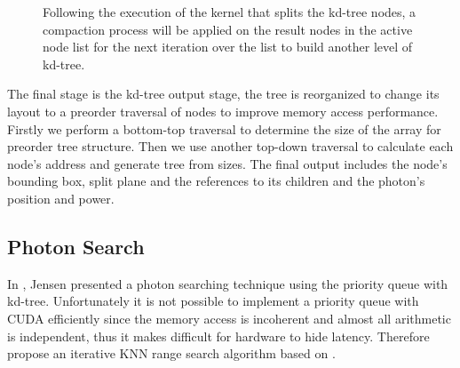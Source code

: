 \begin{figure}[ftp] 
    \centering 
    \renewcommand{\thefigure}{\thechapter.\arabic{figure}}
    \caption[Compacting kd-tree nodes in the active node list for next iteration.]{Following the execution of the kernel that splits the kd-tree nodes, a compaction process will be applied on the result nodes in the active node list for the next iteration over the list to build another level of kd-tree.}
    \label{fig:compact_active_list} 
\end{figure} 

The final stage is the kd-tree output stage, the tree is reorganized to change its layout to a preorder traversal of nodes to improve memory access performance. Firstly we perform a bottom-top traversal to determine the size of the array for preorder tree structure. Then we use another top-down traversal to calculate each node's address and generate tree from sizes. The final output includes the node's bounding box, split plane and the references to its children and the photon's position and power. 

\subsection{Photon Search}
In \cite{HenrikWannJensen2004}, Jensen presented a photon searching technique using the priority queue with kd-tree. Unfortunately it is not possible to implement a priority queue with CUDA efficiently since the memory access is incoherent and almost all arithmetic is independent, thus it makes difficult for hardware to hide latency. Therefore \citeauthor{Zhou2008} propose an iterative KNN range search algorithm based on \cite{Preparata:1985:CGI:4333}. 

